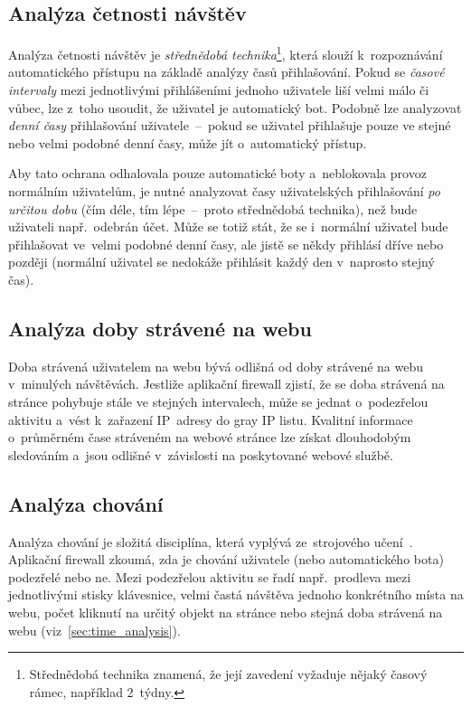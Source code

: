 \subsection*{Analýza četnosti návštěv}
Analýza četnosti návštěv je \textit{střednědobá technika}\footnote{Střednědobá technika znamená, že její zavedení vyžaduje nějaký časový rámec, například 2~týdny.}, která slouží k~rozpoznávání automatického přístupu na základě analýzy časů přihlašování. Pokud se \textit{časové intervaly} mezi jednotlivými přihlášeními jednoho uživatele liší velmi málo či vůbec, lze z~toho usoudit, že uživatel je automatický bot. Podobně lze analyzovat \textit{denní časy} přihlašování uživatele~--~pokud se uživatel přihlašuje pouze ve stejné nebo velmi podobné denní časy, může jít o~automatický přístup.

Aby tato ochrana odhalovala pouze automatické boty a~neblokovala provoz normálním uživatelům, je nutné analyzovat časy uživatelských přihlašování \textit{po určitou dobu} (čím déle, tím lépe~--~proto střednědobá technika), než bude uživateli např.~odebrán účet. Může se totiž stát, že se i~normální uživatel bude přihlašovat ve~velmi podobné denní časy, ale jistě se někdy přihlásí dříve nebo později (normální uživatel se nedokáže přihlásit každý den v~naprosto stejný čas). 

\subsection*{Analýza doby strávené na webu}
\label{sec:time_analysis}
Doba strávená uživatelem na webu bývá odlišná od doby strávené na webu v~minulých návštěvách. Jestliže aplikační firewall zjistí, že se doba strávená na stránce pohybuje stále ve stejných intervalech, může se jednat o~podezřelou aktivitu a~vést k~zařazení IP~adresy do gray IP listu. Kvalitní informace o~průměrném čase stráveném na webové stránce lze získat dlouhodobým sledováním a~jsou odlišné v~závislosti na poskytované webové službě.

\subsection*{Analýza chování}
Analýza chování je složitá disciplína, která vyplývá ze~strojového učení~\cite{bib:behaviorAnalysis}. Aplikační firewall zkoumá, zda je chování uživatele (nebo automatického bota) podezřelé nebo ne. Mezi podezřelou aktivitu se řadí např.~prodleva mezi jednotlivými stisky klávesnice, velmi častá návštěva jednoho konkrétního místa na webu, počet kliknutí na určitý objekt na stránce nebo stejná doba strávená na webu (viz~\ref{sec:time_analysis}). 

